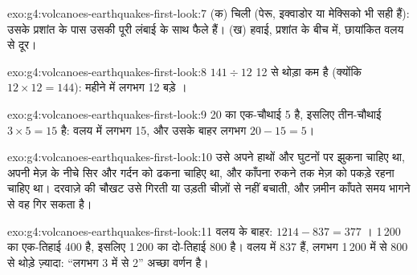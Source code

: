 \begin{solution}{exo:g4:volcanoes-earthquakes-first-look:7}
(क) चिली (पेरू, इक्वाडोर या मेक्सिको भी सही हैं): उसके  प्रशांत  के
पास उसकी पूरी लंबाई के साथ फैले हैं। (ख) हवाई, प्रशांत  के बीच में,
छायांकित वलय से दूर।
\end{solution}

\begin{solution}{exo:g4:volcanoes-earthquakes-first-look:8}
$141 \div 12$ 12 से थोड़ा कम है (क्योंकि $12 \times 12 = 144$): महीने में लगभग
12 बड़े ।
\end{solution}

\begin{solution}{exo:g4:volcanoes-earthquakes-first-look:9}
20 का एक-चौथाई 5 है, इसलिए तीन-चौथाई $3 \times 5 = 15$ है: वलय में लगभग 15,
और उसके बाहर लगभग $20 - 15 = 5$।
\end{solution}

\begin{solution}{exo:g4:volcanoes-earthquakes-first-look:10}
उसे अपने हाथों और घुटनों पर झुकना चाहिए था, अपनी मेज़ के नीचे सिर और गर्दन को
ढकना चाहिए था, और काँपना रुकने तक मेज़ को पकड़े रहना चाहिए था। दरवाज़े की चौखट
उसे गिरती या उड़ती चीज़ों से नहीं बचाती, और ज़मीन काँपते समय भागने से वह गिर
सकता है।
\end{solution}

\begin{solution}{exo:g4:volcanoes-earthquakes-first-look:11}
वलय के बाहर: $1214 - 837 = 377$ । 1\,200 का एक-तिहाई 400 है, इसलिए
1\,200 का दो-तिहाई 800 है। वलय में 837 हैं, लगभग 1\,200 में से 800 से थोड़े
ज़्यादा: ``लगभग 3 में से 2'' अच्छा वर्णन है।
\end{solution}
